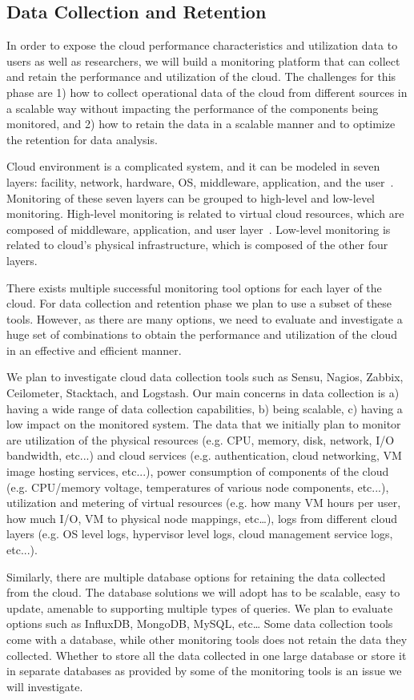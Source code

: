 \subsection{Data Collection and Retention}


In order to expose the cloud performance characteristics and utilization data to users as well as researchers, we will build a monitoring platform that can collect and retain the performance and utilization of the cloud. The challenges for this phase are 1) how to collect operational data of the cloud from different sources in a scalable way without impacting the performance of the components being monitored, and 2) how to retain the data in a scalable manner and to optimize the retention for data analysis.

Cloud environment is a complicated system, and it can be modeled in seven layers: facility, network, hardware, OS, middleware, application, and the user~\cite{spring2011monitoring}. Monitoring of these seven layers can be grouped to high-level and low-level monitoring. 
High-level monitoring is related to virtual cloud resources, which are composed of middleware, application, and user layer~\cite{Aceto2013}. 
Low-level monitoring is related to cloud’s physical infrastructure, which is composed of the other four layers. 

There exists multiple successful monitoring tool options for each layer of the cloud. For data collection and retention phase we plan to use a subset of these tools. However, as there are many options, we need to evaluate and investigate a huge set of combinations to obtain the performance and utilization of the cloud in an effective and efficient manner. 

We plan to investigate cloud data collection tools such as Sensu, Nagios, Zabbix, Ceilometer, Stacktach, and Logstash. Our main concerns in data collection is a) having a wide range of data collection capabilities, b) being scalable, c) having a low impact on the monitored system.  The data that we initially plan to monitor are utilization of the physical resources (e.g. CPU, memory, disk, network, I/O bandwidth, etc...) and cloud services (e.g. authentication, cloud networking, VM image hosting services, etc...), power consumption of components of the cloud (e.g. CPU/memory voltage, temperatures of various node components, etc...), utilization and metering of virtual resources (e.g. how many VM hours per user, how much I/O, VM to physical node mappings, etc…), logs from different cloud layers (e.g. OS level logs, hypervisor level logs, cloud management service logs, etc...).   

Similarly, there are multiple database options for retaining the data collected from the cloud. The database solutions we will adopt has to be scalable, easy to update, amenable to supporting multiple types of queries. We plan to evaluate options such as InfluxDB, MongoDB, MySQL, etc… Some data collection tools come with a database, while other monitoring tools does not retain the data they collected. Whether to store all the data collected in one large database or store it in separate databases as provided by some of the monitoring tools is an issue we will investigate.
